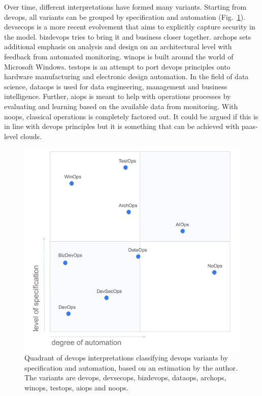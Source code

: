 \documentclass[../main.tex]{subfiles}
\begin{document}
    Over time, different interpretations have formed many variants.
    Starting from \gls{devops}, all variants can be grouped by specification and automation (Fig.~\ref{fig:devops_spec}).
    \gls{devsecops} is a more recent evolvement that aims to explicitly capture security in the model.
    \gls{bizdevops} tries to bring \acrshort{it} and business closer together.
    \gls{archops} sets additional emphasis on analysis and design on an architectural level with feedback from automated monitoring.
    \gls{winops} is built around the world of Microsoft Windows.
    \gls{testops} is an attempt to port \gls{devops} principles onto hardware manufacturing and electronic design automation.
    In the field of data science, \gls{dataops} is used for data engineering, management and business intelligence.
    Further, \gls{aiops} is meant to help with operations processes by evaluating and learning based on the available data from monitoring.
    With \gls{noops}, classical operations is completely factored out.
    It could be argued if this is in line with \gls{devops} principles but it is something that can be achieved with \acrshort{paas}-level \glspl{cloud}.\cite{winops,testops,devsecops,archops,dataops,aiops,noops,bizdevops}


    \begin{figure}[h]
        \centering
        \includegraphics[width=.9\linewidth]{img/def_devops_quadrant_v3.png}
        \captionsetup{justification=centering}
        \caption{
        Quadrant of \gls{devops} interpretations classifying \gls{devops} variants by specification and automation, based on an estimation by the author.
        The variants are \gls{devops}, \gls{devsecops}, \gls{bizdevops}, \gls{dataops}, \gls{archops}, \gls{winops}, \gls{testops}, \gls{aiops} and \gls{noops}.
        }
        \label{fig:devops_spec}
    \end{figure}
\end{document}
